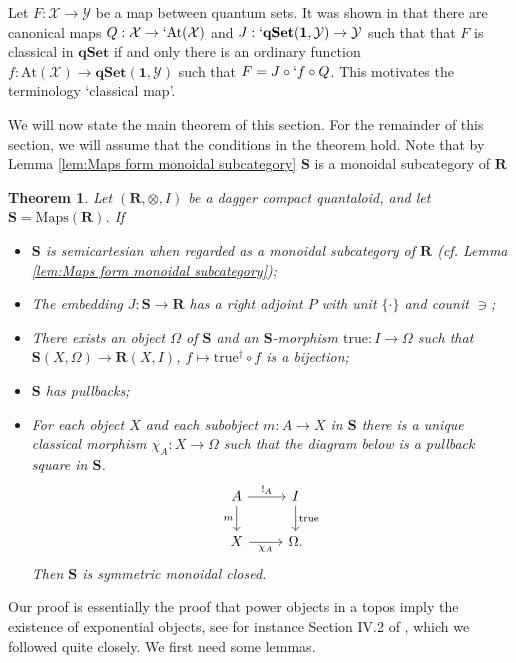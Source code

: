 \documentclass[12pt]{tac}
\newtheorem{theorem}{Theorem}[section]
\theoremstyle{definition}
\theoremstyle{remark}
\newcommand{\X}{\mathcal X}
\newcommand{\Y}{\mathcal Y}
\newcommand{\<}{\langle}
\renewcommand{\>}{\rangle}
\renewcommand{\:}{\colon}
\newcommand{\At}{\mathrm{At}}
\newcommand{\qSet}{\mathbf{qSet}}
\begin{document}
Let $F:\X\to\Y$ be a map between quantum sets. It was shown in \cite[Lemma 10.7 \& Proposition 10.8]{Kornell18} that there are canonical maps $Q:\X\to`\At(\X)$ and $J:`\qSet(\mathbf 1,\Y)\to\Y$ such that that $F$ is classical in $\mathbf{qSet}$ if and only there is an ordinary function $f:\At(\X)\to\qSet(\mathbf 1,\Y)$ such that $F=J\circ`f\circ Q$. This motivates the terminology `classical map'.


We will now state the main theorem of this section. For the remainder of this section, we will assume that the conditions in the theorem hold. Note that by Lemma \ref{lem:Maps form monoidal subcategory} $\mathbf S$ is a monoidal subcategory of $\mathbf R$ 

\begin{theorem}\label{thm:inner hom S}
Let $(\mathbf R,\otimes,I)$ be a dagger compact quantaloid, and let $\mathbf S=\mathrm{Maps}(\mathbf R)$. If
\begin{itemize}
\item[(1)] $\mathbf S$ is semicartesian when regarded as a monoidal subcategory of $\mathbf R$ (cf. Lemma \ref{lem:Maps form monoidal subcategory});
    \item[(2)] The embedding $J:\mathbf S\to\mathbf R$ has a right adjoint $P$ with unit $\{\cdot\}$ and counit $\ni$;
    \item[(3)] There exists an object $\Omega$ of $\mathbf S$ and an $\mathbf S$-morphism $\mathrm{true}:I\to \Omega$ such that $\mathbf S(X,\Omega)\to\mathbf R(X,I)$, $f\mapsto \mathrm{true}^\dag\circ f$ is a bijection;
    \item[(4)] $\mathbf S$ has pullbacks;
    \item[(5)] For each object $X$ and each subobject $m:A\to X$ in $\mathbf S$ there is a unique classical morphism $\chi_A:X\to\Omega$ such that the diagram below is a pullback square in $\mathbf S$.
        \[\begin{tikzcd}
A\ar{r}{!_A}\ar{d}[swap]{m} & I\ar{d}{\mathrm{true}}\\
X\ar{r}[swap]{\chi_A} & \Omega.
\end{tikzcd}\]
Then $\mathbf S$ is symmetric monoidal closed.
    \end{itemize}
\end{theorem}

Our proof is essentially the proof that power objects in a topos imply the existence of exponential objects, see for instance Section IV.2 of \cite{MacLane-Moerdijk}, which we followed quite closely. We first need some lemmas.
\end{document}
